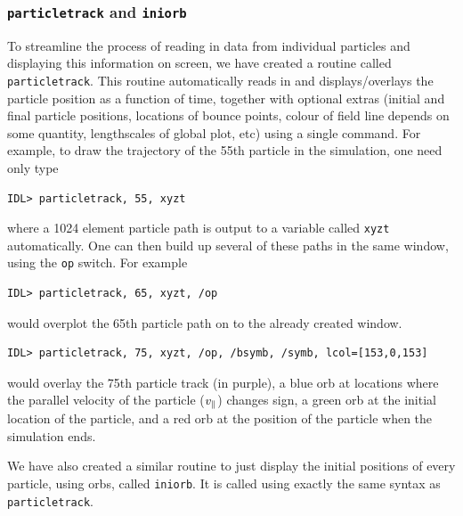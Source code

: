 \documentclass[a4paper,11pt,usenames,dvipsnames]{article}
\begin{document}
\subsubsection{\texttt{particletrack} and \texttt{iniorb}}
To streamline the process of reading in data from individual particles and displaying this information on screen, we have created a routine called \texttt{particletrack}. This routine automatically reads in and displays/overlays the particle position as a function of time, together with optional extras (initial and final particle positions, locations of bounce points, colour of field line depends on some quantity, lengthscales of global plot, etc) using a single command.
For example, to draw the trajectory of the 55th particle in the simulation, one need only type 
\begin{verbatim}
IDL> particletrack, 55, xyzt
\end{verbatim}
where a 1024 element particle path is output to a variable called \texttt{xyzt} automatically. One can then build up several of these paths in the same window, using the \texttt{op} switch. For example
\begin{verbatim}
IDL> particletrack, 65, xyzt, /op
\end{verbatim}
would overplot the 65th particle path on to the already created window. 
\begin{verbatim}
IDL> particletrack, 75, xyzt, /op, /bsymb, /symb, lcol=[153,0,153]
\end{verbatim}
would overlay the 75th particle track (in purple), a blue orb at locations where the parallel velocity of the particle ($v_{\parallel}$) changes sign, a green orb at the initial location of the particle, and a red orb at the position of the particle when the simulation ends. 

We have also created a similar routine to just display the initial positions of every particle, using orbs, called \texttt{iniorb}. It is called using exactly the same syntax as \texttt{particletrack}.
\end{document}
